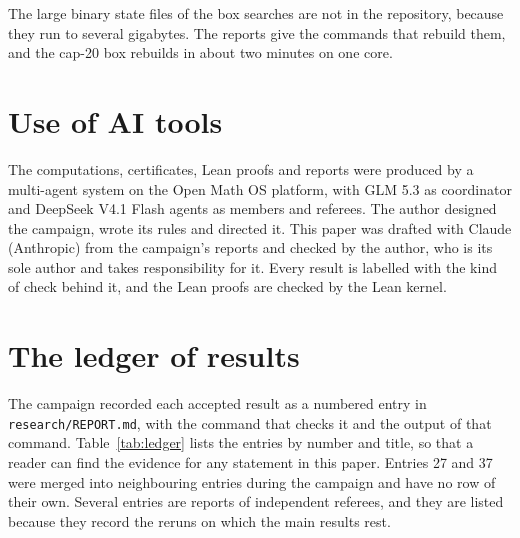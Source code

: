 \documentclass[11pt,a4paper]{article}
\theoremstyle{definition}
\begin{document}
The large binary state files of the box searches are not in the repository, because they run to several gigabytes. The reports give the commands that rebuild them, and the cap-20 box rebuilds in about two minutes on one core.

\section{Use of AI tools}

The computations, certificates, Lean proofs and reports were produced by a multi-agent system on the Open Math OS platform, with GLM 5.3 as coordinator and DeepSeek V4.1 Flash agents as members and referees. The author designed the campaign, wrote its rules and directed it. This paper was drafted with Claude (Anthropic) from the campaign's reports and checked by the author, who is its sole author and takes responsibility for it. Every result is labelled with the kind of check behind it, and the Lean proofs are checked by the Lean kernel.


\appendix
\section{The ledger of results}\label{app:ledger}

The campaign recorded each accepted result as a numbered entry in \texttt{research/REPORT.md}, with the command that checks it and the output of that command. Table~\ref{tab:ledger} lists the entries by number and title, so that a reader can find the evidence for any statement in this paper. Entries 27 and 37 were merged into neighbouring entries during the campaign and have no row of their own. Several entries are reports of independent referees, and they are listed because they record the reruns on which the main results rest.
\end{document}
